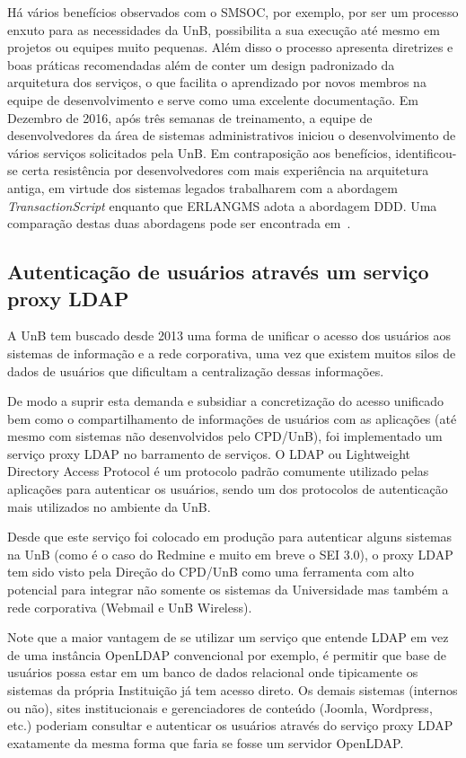 \documentclass[12pt]{article}
\begin{document}
Há vários benefícios observados com o SMSOC,
por exemplo, por ser um processo enxuto para as 
necessidades da UnB, possibilita
a sua execução até mesmo em projetos ou equipes muito pequenas. Além disso
o processo apresenta diretrizes e boas práticas recomendadas além de conter
um design padronizado 
da arquitetura dos serviços, o que facilita o aprendizado por novos membros na equipe
de desenvolvimento e serve como 
uma excelente documentação. Em Dezembro de 2016, após três semanas de 
treinamento, a equipe de desenvolvedores da área de sistemas administrativos 
iniciou o desenvolvimento de vários serviços solicitados pela UnB. 
Em contraposição aos benefícios,
identificou-se certa resistência por desenvolvedores com 
mais experiência na arquitetura antiga, em virtude dos sistemas
legados trabalharem com a abordagem \textit{TransactionScript} enquanto que 
ERLANGMS adota a abordagem DDD. Uma comparação
destas duas abordagens pode ser encontrada em~\cite{agilar2016}.




\subsection{Autenticação de usuários através um serviço proxy LDAP}\label{ldap}

A UnB tem buscado desde 2013 uma forma de unificar o acesso dos usuários aos
sistemas de informação e a rede corporativa, uma vez que existem muitos
silos de dados de usuários que dificultam a centralização dessas informações. 

De modo a suprir esta demanda e subsidiar a concretização do acesso 
unificado bem como o compartilhamento de informações de usuários
com as aplicações (até mesmo com sistemas não desenvolvidos pelo CPD/UnB), 
foi implementado um serviço proxy LDAP no barramento de serviços.
O LDAP ou Lightweight Directory Access Protocol é um 
protocolo padrão comumente utilizado pelas aplicações para autenticar os usuários,
sendo um dos protocolos de autenticação mais utilizados no ambiente da UnB.

Desde que este serviço foi colocado em produção para 
autenticar alguns sistemas na UnB (como é o caso do Redmine e muito em breve o SEI 3.0),
o proxy LDAP tem sido visto pela Direção do CPD/UnB como uma ferramenta
com alto potencial para integrar não somente os sistemas da Universidade
mas também a rede corporativa (Webmail e UnB Wireless).

Note que a maior vantagem de se utilizar um serviço que entende LDAP
em vez de uma instância OpenLDAP convencional por exemplo, 
é permitir que base de usuários possa
estar em um banco de dados relacional onde tipicamente os sistemas da própria Instituição
já tem acesso direto. Os demais sistemas (internos ou não), sites institucionais 
e gerenciadores de conteúdo (Joomla, Wordpress, etc.)
poderiam consultar e autenticar os usuários através do serviço proxy LDAP 
exatamente da mesma forma que faria se fosse um servidor OpenLDAP.
\end{document}
